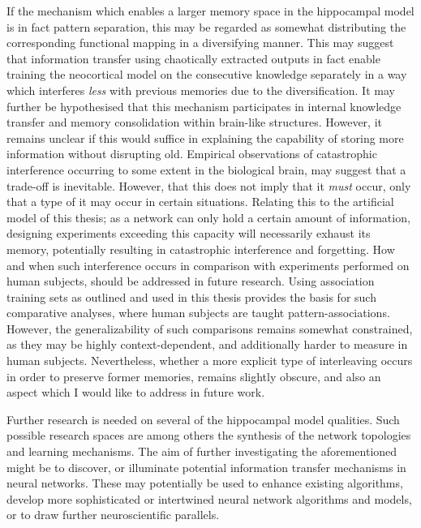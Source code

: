 If the mechanism which enables a larger memory space in the hippocampal model is in fact pattern separation, this may be regarded as somewhat distributing the corresponding functional mapping in a diversifying manner. This may suggest that information transfer using chaotically extracted outputs in fact enable training the neocortical model on the consecutive knowledge separately in a way which interferes \textit{less} with previous memories due to the diversification.
It may further be hypothesised that this mechanism participates in internal knowledge transfer and memory consolidation within brain-like structures. However, it remains unclear if this would suffice in explaining the capability of storing more information without disrupting old. Empirical observations of catastrophic interference occurring to some extent in the biological brain, may suggest that a trade-off is inevitable. However, that this does not imply that it \textit{must} occur, only that a type of it may occur in certain situations. Relating this to the artificial model of this thesis; as a network can only hold a certain amount of information, designing experiments exceeding this capacity will necessarily exhaust its memory, potentially resulting in catastrophic interference and forgetting. How and when such interference occurs in comparison with experiments performed on human subjects, should be addressed in future research. Using association training sets as outlined and used in this thesis provides the basis for such comparative analyses, where human subjects are taught pattern-associations. However, the generalizability of such comparisons remains somewhat constrained, as they may be highly context-dependent, and additionally harder to measure in human subjects.
Nevertheless, whether a more explicit type of interleaving occurs in order to preserve former memories, remains slightly obscure, and also an aspect which I would like to address in future work.

Further research is needed on several of the hippocampal model qualities. Such possible research spaces are among others the synthesis of the network topologies and learning mechanisms. The aim of further investigating the aforementioned might be to discover, or illuminate potential information transfer mechanisms in neural networks. These may potentially be used to enhance existing algorithms, develop more sophisticated or intertwined neural network algorithms and models, or to draw further neuroscientific parallels.
\\

